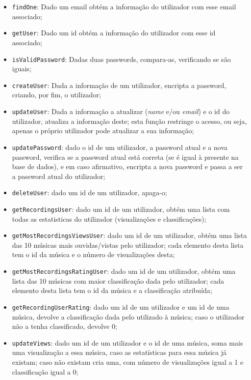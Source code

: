 \documentclass{article}
\begin{document}
    \begin{itemize}
        \item \texttt{findOne}: Dado um email obtém a informação do utilizador com esse email associado;
        \item \texttt{getUser}: Dado um id obtém a informação do utilizador com esse id associado;
        \item \texttt{isValidPassword}: Dadas duas passwords, compara-as, verificando se são iguais;
        \item \texttt{createUser}: Dada a informação de um utilizador, encripta a password, criando, por fim, o utilizador;
        \item \texttt{updateUser}: Dada a informação a atualizar (\textit{name} e/ou \textit{email}) e o id do utilizador, atualiza a informação deste; esta função restringe o acesso, ou seja, apenas o próprio utilizador pode atualizar a sua informação;
        \item \texttt{updatePassword}: dado o id de um utilizador, a password atual e a nova password, verifica se a password atual está correta (se é igual à presente na base de dados), e em caso afirmativo, encripta a nova password e passa a ser a password atual do utilizador;
        \item \texttt{deleteUser}: dado um id de um utilizador, apaga-o;
        \item \texttt{getRecordingsUser}: dado um id de um utilizador, obtém uma lista com todas as estatisticas do utilizador (visualizações e classificações);
        \item \texttt{getMostRecordingsViewsUser}: dado um id de um utilizador, obtém uma lista das 10 músicas mais ouvidas/vistas pelo utilizador; cada elemento desta lista tem o id da música e o número de visualizações desta;
        \item \texttt{getMostRecordingsRatingUser}: dado um id de um utilizador, obtém uma lista das 10 músicas com maior classificação dada pelo utilizador; cada elemento desta lista tem o id da música e a classificação atribuída;
        \item \texttt{getRecordingUserRating}: dado um id de um utilizador e um id de uma música, devolve a classificação dada pelo utilizado à música; caso o utilizador não a tenha classificado, devolve 0;
        \item \texttt{updateViews}: dado um id de um utilizador e o id de uma música, soma mais uma visualização a essa música, caso as estatísticas para essa música já existam; caso não existam cria uma, com número de visualizações igual a 1 e classificação igual a 0;

\end{itemize}
\end{document}
